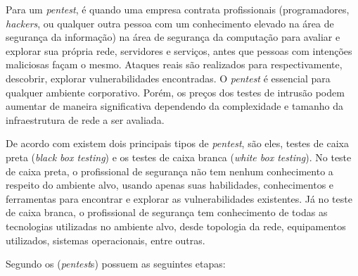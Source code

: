 Para  um \textit{\gls{pentest}}, é quando uma empresa contrata profissionais (programadores, \textit{hackers}, ou qualquer outra pessoa com um conhecimento elevado na área de segurança da informação) na área de segurança da computação para avaliar e explorar sua própria rede, servidores e serviços, antes que pessoas com intenções maliciosas façam o mesmo. Ataques reais são realizados para respectivamente, descobrir, explorar vulnerabilidades encontradas. O \textit{\gls{pentest}} é essencial para qualquer ambiente corporativo. Porém, os preços dos testes de intrusão podem aumentar de maneira significativa dependendo da complexidade e tamanho da infraestrutura de rede a ser avaliada.

De acordo com  existem dois principais tipos de \textit{\gls{pentest}}, são eles, testes de caixa preta (\textit{black box testing}) e os testes de caixa branca (\textit{white box testing}). No teste de caixa preta, o profissional de segurança não tem nenhum conhecimento a respeito do  ambiente alvo, usando apenas suas habilidades, conhecimentos e ferramentas para encontrar e explorar as vulnerabilidades existentes. Já no teste de caixa branca, o profissional de segurança tem conhecimento de todas as tecnologias utilizadas no ambiente alvo, desde topologia da rede, equipamentos utilizados, sistemas operacionais, entre outras.

Segundo  os (\textit{pentest}s) possuem as seguintes etapas:


